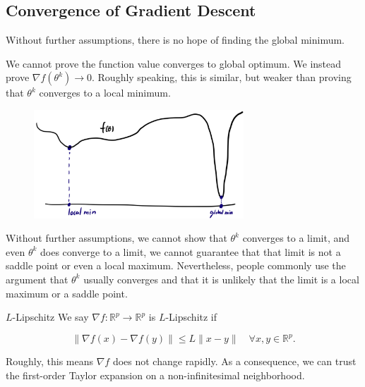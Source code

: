 \subsection{Convergence of Gradient Descent}


\begin{frame}[allowframebreaks]

Without further assumptions, there is no hope of finding the global minimum.

We cannot prove the function value converges to global optimum. We instead prove $\nabla f\left(\theta^{k}\right) \rightarrow 0$. Roughly speaking, this is similar, but weaker than proving that $\theta^{k}$ converges to a local minimum.

\begin{figure}[H]
    \centering
    \includegraphics[width=0.7\textwidth]{.././assets/2.2.png}
\end{figure}

Without further assumptions, we cannot show that $\theta^{k}$ converges to a limit, and even $\theta^{k}$ does converge to a limit, we cannot guarantee that that limit is not a saddle point or even a local maximum. Nevertheless, people commonly use the argument that $\theta^{k}$ usually converges and that it is unlikely that the limit is a local maximum or a saddle point.

\end{frame}

\begin{frame}[allowframebreaks]

\begin{mydefinitionblock}{2.3}{$L$-Lipschitz}
    We say $\nabla f: \mathbb{R}^{p} \rightarrow \mathbb{R}^{p}$ is $L$-Lipschitz if

    $$
    \|\nabla f(x)-\nabla f(y)\| \leq L\|x-y\| \quad \forall x, y \in \mathbb{R}^{p} .
    $$

    Roughly, this means $\nabla f$ does not change rapidly. As a consequence, we can trust the first-order Taylor expansion on a non-infinitesimal neighborhood.
\end{mydefinitionblock}

\end{frame}


